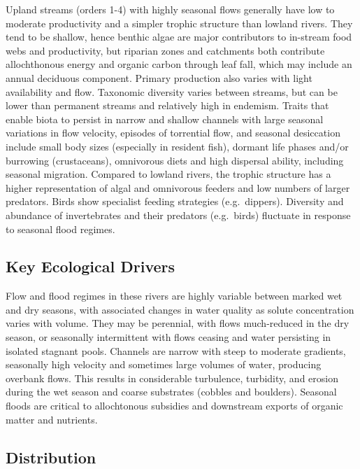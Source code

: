 \documentclass[
  letterpaper,
  DIV=11,
  numbers=noendperiod]{scrartcl}
\begin{document}
Upland streams (orders 1-4) with highly seasonal flows generally have
low to moderate productivity and a simpler trophic structure than
lowland rivers. They tend to be shallow, hence benthic algae are major
contributors to in-stream food webs and productivity, but riparian zones
and catchments both contribute allochthonous energy and organic carbon
through leaf fall, which may include an annual deciduous component.
Primary production also varies with light availability and flow.
Taxonomic diversity varies between streams, but can be lower than
permanent streams and relatively high in endemism. Traits that enable
biota to persist in narrow and shallow channels with large seasonal
variations in flow velocity, episodes of torrential flow, and seasonal
desiccation include small body sizes (especially in resident fish),
dormant life phases and/or burrowing (crustaceans), omnivorous diets and
high dispersal ability, including seasonal migration. Compared to
lowland rivers, the trophic structure has a higher representation of
algal and omnivorous feeders and low numbers of larger predators. Birds
show specialist feeding strategies (e.g.~dippers). Diversity and
abundance of invertebrates and their predators (e.g.~birds) fluctuate in
response to seasonal flood regimes.

\subsection{Key Ecological Drivers}\label{key-ecological-drivers-3}

Flow and flood regimes in these rivers are highly variable between
marked wet and dry seasons, with associated changes in water quality as
solute concentration varies with volume. They may be perennial, with
flows much-reduced in the dry season, or seasonally intermittent with
flows ceasing and water persisting in isolated stagnant pools. Channels
are narrow with steep to moderate gradients, seasonally high velocity
and sometimes large volumes of water, producing overbank flows. This
results in considerable turbulence, turbidity, and erosion during the
wet season and coarse substrates (cobbles and boulders). Seasonal floods
are critical to allochtonous subsidies and downstream exports of organic
matter and nutrients.

\subsection{Distribution}\label{distribution-3}
\end{document}
